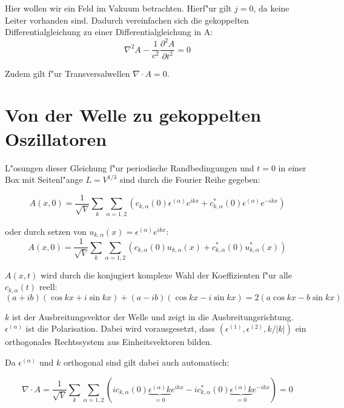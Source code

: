 Hier wollen wir ein Feld im Vakuum betrachten. Hierf"ur gilt $j = 0$, da keine Leiter vorhanden sind.
Dadurch vereinfachen sich die gekoppelten Differentialgleichung zu einer Differentialgleichung in A:
\begin{equation}
\nabla^2 A - \frac{1}{c^2} \frac{\partial^2 A }{\partial t^2} = 0
\end{equation}

Zudem gilt f"ur Transversalwellen $\nabla \cdot A = 0$.

\section{Von der Welle zu gekoppelten Oszillatoren}
L"osungen dieser Gleichung f"ur periodische Randbedingungen und $t=0$ in einer Box mit Seitenl"ange $L = V^{1/3}$ sind durch die Fourier Reihe gegeben:

\begin{equation}
A(x,0) = \frac{1}{\sqrt{V}} \sum_k \sum_{\alpha=1,2} (c_{k,\alpha}(0) \epsilon^{(\alpha)} e^{ikx} + c^*_{k,\alpha}(0) \epsilon^{(\alpha)} e^{-ikx})
\end{equation}

oder durch setzen von $u_{k,\alpha}(x) = \epsilon^{(\alpha)} e^{ikx}$:
\begin{equation}
A(x,0) = \frac{1}{\sqrt{V}} \sum_k \sum_{\alpha=1,2} (c_{k,\alpha}(0)u_{k,\alpha}(x) + c^*_{k,\alpha}(0) u^*_{k,\alpha}(x))
\end{equation}

$A(x,t)$ wird durch die konjugiert komplexe Wahl der Koeffizienten f"ur alle $c_{k,\alpha}(t)$ reell:
\begin{equation}
(a + ib)(\cos kx + i \sin kx ) + (a - ib)(\cos kx - i \sin kx ) = 2 ( a \cos kx - b \sin kx )
\end{equation}

$k$ ist der Ausbreitungsvektor der Welle und zeigt in die Ausbreitungsrichtung. $\epsilon^{(\alpha)}$ ist die Polarisation. Dabei wird vorausgesetzt, dass $(\epsilon^{(1)}, \epsilon^{(2)} , k/|k|)$ ein orthogonales Rechtssystem aus Einheitsvektoren bilden.

Da $\epsilon^{(\alpha)}$ und $k$ orthogonal sind gilt dabei auch automatisch:

\begin{equation}
\nabla \cdot A = \frac{1}{\sqrt{V}} \sum_k \sum_{\alpha=1,2} (i c_{k,\alpha}(0) \underbrace{\epsilon^{(\alpha)} k}_{=0} e^{ikx} - i c^*_{k,\alpha}(0) \underbrace{\epsilon^{(\alpha)} k}_{=0} e^{-ikx}) = 0
\end{equation}

